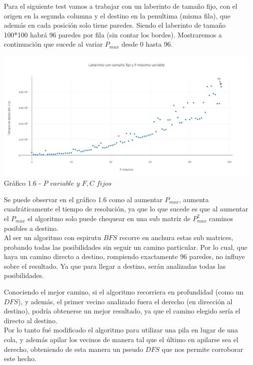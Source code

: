 Para el siguiente test vamos a trabajar con un laberinto de tamaño fijo, con el origen en la segunda columna y el destino en la penultima (misma fila), que además en cada posición solo tiene paredes. Siendo el laberinto de tamaño 100*100 habrá 96 paredes por fila (sin contar los bordes).
Mostraremos a continuaci\'on que sucede al variar $P_{max}$ desde 0 hasta 96.\\

\vspace*{0.3cm} \vspace*{0.3cm}
  \begin{center}
\includegraphics[scale=0.6]{./EJ1/pVariableBfs.png}
{Gr\'afico 1.6 - $P$ $variable$ $y$ $F,C$ $fijos$}
  \end{center}
  \vspace*{0.3cm}

Se puede observar en el gr\'afico 1.6 como al aumentar $P_{max}$, aumenta cuadráticamente el tiempo de resoluci\'on, ya que lo que sucede es que al aumentar el $P_{max}$ el algoritmo solo puede chequear en una sub matriz de $P_{max}^2$ caminos posibles a destino.\\
Al ser un algoritmo con espirutu $BFS$ recorre en anchura estas sub matrices, probando todas las posibilidades sin seguir un camino particular.  Por lo cual, que haya un camino directo a destino, rompiendo exactamente 96 paredes, no influye sobre el resultado. Ya que para llegar a destino, serán analizadas todas las posibilidades. 

Conociendo el mejor camino, si el algoritmo recorriera en profundidad (como un $DFS$), y además, el primer vecino analizado fuera el derecho (en dirección al destino), podría obtenerse un mejor resultado, ya que el camino elegido sería el directo al destino.\\ 
Por lo tanto fué modificado el algoritmo para utilizar una pila en lugar de una cola, y además apilar los vecinos de manera tal que el último en apilarse sea el derecho, obteniendo de esta manera un pseudo $DFS$ que nos permite corroborar este hecho.\\

